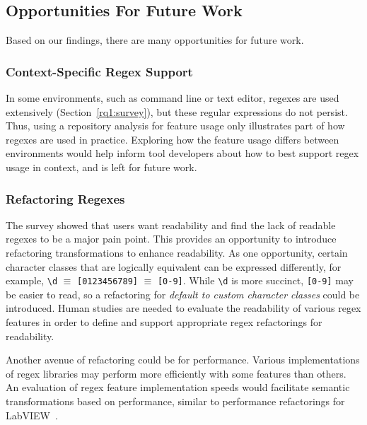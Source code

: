 \subsection{Opportunities For Future Work}

Based on our findings, there are many opportunities for future work.



\subsubsection{Context-Specific Regex Support}
In some environments, such as command line or text editor, regexes are used extensively (Section~\ref{rq1:survey}), but these regular expressions do not persist. Thus, using a repository analysis for feature usage only illustrates part of how regexes are used in practice. Exploring how the feature usage differs between environments would help inform tool developers about how to best support regex usage in context, and is left for future work.

\subsubsection{Refactoring Regexes}
The survey showed that users want readability and find the lack of readable regexes to be a major pain point.
This provides an opportunity to introduce refactoring transformations to enhance readability.
As one opportunity, certain character classes that are logically equivalent can be expressed differently, for example, \verb!\d! $\equiv$ \verb![0123456789]! $\equiv$ \verb![0-9]!. While \verb!\d! is more succinct, \verb![0-9]! may be easier to read, so a refactoring for \emph{default to custom character classes} could be introduced.
Human studies are needed to evaluate the readability of various regex features in order to define and support appropriate regex refactorings for readability.

Another avenue of refactoring could be for performance. Various implementations of regex libraries may perform more efficiently with some features than others. An evaluation of regex feature implementation speeds would facilitate semantic transformations based on performance, similar to performance refactorings for LabVIEW~\cite{chambers2013smell, chambers2015impact}.



